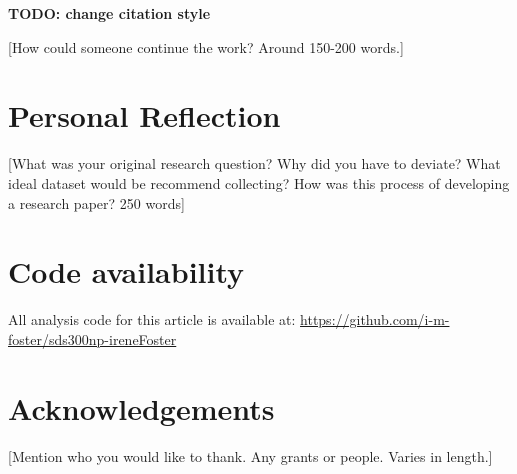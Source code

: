 \documentclass[,article,submit,moreauthors,pdftex]{mdpi}
\begin{document}
\textbf{TODO: change citation style}

{[}How could someone continue the work? Around 150-200 words.{]}

\hypertarget{personal-reflection}{%
\section{Personal Reflection}\label{personal-reflection}}

{[}What was your original research question? Why did you have to
deviate? What ideal dataset would be recommend collecting? How was this
process of developing a research paper? 250 words{]}

\hypertarget{code-availability}{%
\section{Code availability}\label{code-availability}}

All analysis code for this article is available at:
\url{https://github.com/i-m-foster/sds300np-ireneFoster}

\hypertarget{acknowledgements}{%
\section{Acknowledgements}\label{acknowledgements}}

{[}Mention who you would like to thank. Any grants or people. Varies in
length.{]}

%

\vspace{6pt}




\end{document}
